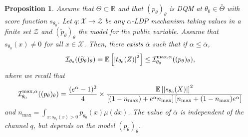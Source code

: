 \documentclass[a4paper, 11pt]{article}
\newtheorem{prop}{Proposition}
\theoremstyle{definition}
\newcommand{\E}{{\mathbb{E}}}
\newcommand{\R}{{\mathbb{R}}}
\newcommand{\cI}{{\mathcal{I}}}
\newcommand{\cX}{{\mathcal{X}}}
\newcommand{\cZ}{{\mathcal{Z}}}
\DeclarePairedDelimiter{\abs}{\lvert}{\rvert}
\begin{document}
{\begin{prop}\label{prop : borne sup Fisher fini}
	Assume that $\Theta \subset \R$ and that $(p_{\theta})_\theta$ 
	is DQM at $\theta_0 \in \overset{\circ}{\Theta}$ with score function $s_{\theta_0}$. Let $q : \cX \to \cZ$ be any $\alpha$-LDP mechanism taking values in a finite set $\cZ$
	and $(\widetilde{p}_\theta)_\theta$ the model for the public variable.
	 Assume that $s_{\theta_0}(x)\neq 0$ for all $x\in \cX$.
	Then, there exists $\overline{\alpha}$ such that if $\alpha \le \overline{\alpha}$,
	\begin{equation} \label{eq :  uppper bound Fisher finite exacte}
		\cI_{\theta_0}((\widetilde{p}_\theta)_\theta)=\E\left[\abs*{t_{\theta_0}(Z)}^2\right] \le 
		\cI^{\text{max},\alpha}_{\theta_0}((p_\theta)_\theta),
	\end{equation}
	where we recall that
	\begin{equation*}
\cI^{\text{max},\alpha}_{\theta_0}((p_\theta)_\theta)
=\frac{(e^\alpha-1)^2}{4}%
\times \frac{\E\left[\abs{s_{\theta_0}(X)}\right]^2}{\left[ (1-n_\text{max})+e^\alpha n_\text{max}  \right]
\left[n_\text{max}+(1-n_\text{max})e^\alpha  \right]}
	\end{equation*}
	and $n_\text{max}=\int_{x: s_{\theta_0}(x)>0} p_{\theta_0}(x) \mu(dx)$.
	  The value of $\overline{\alpha}$ is independent of the channel $q$, but depends on the model $(p_{\theta})_\theta$.
\end{prop}	

}
\end{document}
